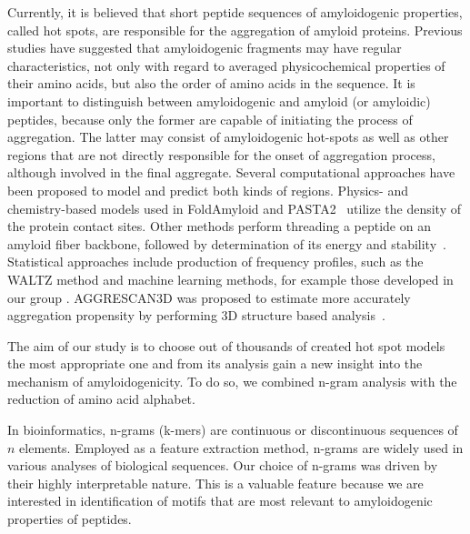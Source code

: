\documentclass[fleqn,10pt,twoside]{gcb15submission}
\begin{document}
  Currently, it is believed that short peptide sequences of amyloidogenic 
properties, called hot spots, are responsible for the aggregation of amyloid 
proteins. Previous studies have suggested that amyloidogenic fragments may have 
regular characteristics, not only with regard to averaged physicochemical 
properties of their amino acids, but also the order of amino acids in the 
sequence. 
%
%
%
  It is important to distinguish between amyloidogenic and amyloid (or 
amyloidic) peptides, because only the former are capable of initiating the 
process of aggregation. The latter may consist of amyloidogenic hot-spots as 
well as other regions that are not directly responsible for the onset of 
aggregation process, although involved in the final aggregate. Several 
computational approaches have been proposed to model and predict both kinds of 
regions. Physics- and chemistry-based models used in  
FoldAmyloid and PASTA2~\citep{garbuzynskiy_foldamyloid:_2010} utilize the density of the 
protein contact sites. Other methods perform threading a peptide on an amyloid 
fiber backbone, followed by determination of its energy and 
stability~\citep{odonnell_method_2011}. Statistical approaches include 
production of frequency profiles, such as the WALTZ method 
\citep{beerten_waltz-db:_2015} and machine learning methods, for example those 
developed in our group \citep{stanislawski_machine_2013, gasior_fish_2014}. 
AGGRESCAN3D was proposed to estimate more accurately aggregation propensity by 
performing 3D structure based analysis~\citep{zambrano_aggrescan3d_2015}. 


%
%
%
  The aim of our study is to choose out of thousands of created hot spot 
models the most appropriate one and from its analysis gain a new insight into the 
mechanism of amyloidogenicity. To do so, we combined n-gram analysis with the
reduction of amino acid alphabet.
  
  In bioinformatics, n-grams (k-mers) are continuous or discontinuous sequences 
of $n$ elements. Employed as a feature extraction method, n-grams are widely 
used in various analyses of biological sequences. Our choice of n-grams was driven by 
their highly interpretable nature. This is a valuable feature because we are 
interested in identification of motifs that are most relevant to amyloidogenic 
properties of peptides.
\end{document}

